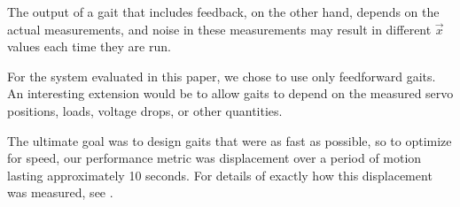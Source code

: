 The output of a gait that includes feedback, on the other hand,
depends on the actual measurements, and noise in these measurements
may result in different $\vec{x}$ values each time they are run.

For the system evaluated in this paper, we chose to use only
feedforward gaits.  An interesting extension would be to allow gaits
to depend on the measured servo positions, loads, voltage drops, or
other quantities.

The ultimate goal was to design gaits that were as fast as possible,
so to optimize for speed, our performance metric was displacement over
a period of motion lasting approximately 10 seconds.  For details of
exactly how this displacement was measured, see
.
